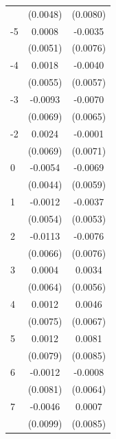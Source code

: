 \begin{tabular}{l*{2}{c}}
                    &    (0.0048)         &    (0.0080)         \\
-5                  &      0.0008         &     -0.0035         \\
                    &    (0.0051)         &    (0.0076)         \\
-4                  &      0.0018         &     -0.0040         \\
                    &    (0.0055)         &    (0.0057)         \\
-3                  &     -0.0093         &     -0.0070         \\
                    &    (0.0069)         &    (0.0065)         \\
-2                  &      0.0024         &     -0.0001         \\
                    &    (0.0069)         &    (0.0071)         \\
0                   &     -0.0054         &     -0.0069         \\
                    &    (0.0044)         &    (0.0059)         \\
1                   &     -0.0012         &     -0.0037         \\
                    &    (0.0054)         &    (0.0053)         \\
2                   &     -0.0113\sym{*}  &     -0.0076         \\
                    &    (0.0066)         &    (0.0076)         \\
3                   &      0.0004         &      0.0034         \\
                    &    (0.0064)         &    (0.0056)         \\
4                   &      0.0012         &      0.0046         \\
                    &    (0.0075)         &    (0.0067)         \\
5                   &      0.0012         &      0.0081         \\
                    &    (0.0079)         &    (0.0085)         \\
6                   &     -0.0012         &     -0.0008         \\
                    &    (0.0081)         &    (0.0064)         \\
7                   &     -0.0046         &      0.0007         \\
                    &    (0.0099)         &    (0.0085)         \\

\end{tabular}
